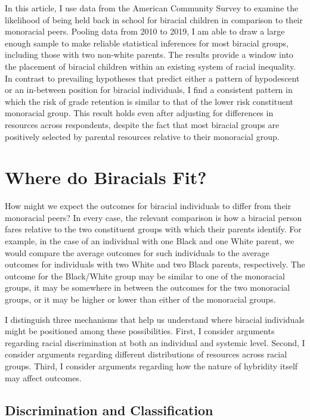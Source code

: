 \documentclass[
  12pt,
  letterpaper,
]{article}
\begin{document}
In this article, I use data from the American Community Survey to
examine the likelihood of being held back in school for biracial
children in comparison to their monoracial peers. Pooling data from 2010
to 2019, I am able to draw a large enough sample to make reliable
statistical inferences for most biracial groups, including those with
two non-white parents. The results provide a window into the placement
of biracial children within an existing system of racial inequality. In
contrast to prevailing hypotheses that predict either a pattern of
hypodescent or an in-between position for biracial individuals, I find a
consistent pattern in which the risk of grade retention is similar to
that of the lower risk constituent monoracial group. This result holds
even after adjusting for differences in resources across respondents,
despite the fact that most biracial groups are positively selected by
parental resources relative to their monoracial group.

\hypertarget{where-do-biracials-fit}{%
\section{Where do Biracials Fit?}\label{where-do-biracials-fit}}

How might we expect the outcomes for biracial individuals to differ from
their monoracial peers? In every case, the relevant comparison is how a
biracial person fares relative to the two constituent groups with which
their parents identify. For example, in the case of an individual with
one Black and one White parent, we would compare the average outcomes
for such individuals to the average outcomes for individuals with two
White and two Black parents, respectively. The outcome for the
Black/White group may be similar to one of the monoracial groups, it may
be somewhere in between the outcomes for the two monoracial groups, or
it may be higher or lower than either of the monoracial groups.

I distinguish three mechanisms that help us understand where biracial
individuals might be positioned among these possibilities. First, I
consider arguments regarding racial discrimination at both an individual
and systemic level. Second, I consider arguments regarding different
distributions of resources across racial groups. Third, I consider
arguments regarding how the nature of hybridity itself may affect
outcomes.

\hypertarget{discrimination-and-classification}{%
\subsection{Discrimination and
Classification}\label{discrimination-and-classification}}
\end{document}
